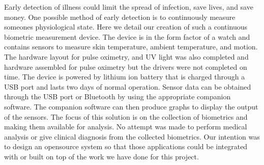 Early detection of illness could limit the spread of infection, save lives, and
save money.  One possible method of early detection is to continuously measure
someones physiological state.  Here we detail our creation of such a continuous
biometric measurement device.  The device is in the form factor of a watch and
contains sensors to measure skin temperature, ambient temperature, and motion.  
The hardware layout for pulse oximetry, and UV light was also completed and 
hardware assembled for pulse oximetry but the drivers were not completed on time.
The device is powered by lithium ion battery that is charged
through a USB port and lasts two days of normal operation.  Sensor data can be
obtained through the USB port or Bluetooth by using the appropriate companion
software.  The companion software can then produce graphs to display the output
of the sensors.  The focus of this solution is on the collection of biometrics
and making them available for analysis.  No attempt was made to perform medical
analysis or give clinical diagnosis from the collected biometrics.  Our
intention was to design an opensource system so that those applications could be
integrated with or built on top of the work we have done for this project.
